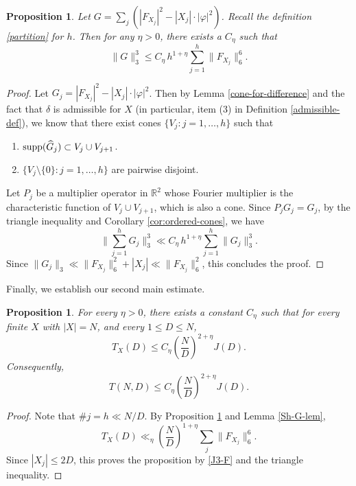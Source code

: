 \documentclass{amsart}
\numberwithin{equation}{section}
\newtheorem{proposition}[theorem]{Proposition}
\newcommand{\vp}{\varphi}
\newcommand{\wh}{\widehat}
\newcommand{\ZR}{\mathbb{R}}
\newcommand{\supp}{{\rm supp}}
\begin{document}
\begin{proposition}
    \label{ortho-prop}
    Let $G=\sum_j(|F_{X_j}|^2-|X_j|\cdot |\vp|^2)$.
    Recall the definition \eqref{partition} for $h$.
    Then for any $\eta>0$, there exists a $C_\eta$ such that
    \begin{equation}
        \|G\|_3^3\leq C_\eta \,h^{1+\eta}\sum_{j=1}^h\|F_{X_j}\|_6^6.
    \end{equation}
\end{proposition}
\begin{proof}
    Let $G_j=|F_{X_j}|^2-|X_j|\cdot |\vp|^2$.
    Then by Lemma \ref{cone-for-difference} and the fact that $\delta$ is admissible for $X$ (in particular, item (3) in Definition \ref{admissible-def}), we know that there exist cones $\{V_j:j=1,\ldots ,h\}$ such that
    \begin{enumerate}
        \item $\supp (\wh G_j)\subset V_j\cup V_{j+1}$.
        \item $\{V_j\setminus\{0\}:j=1,\ldots ,h\}$ are pairwise disjoint.
    \end{enumerate}
    Let $P_j$ be a multiplier operator in $\ZR^2$ whose Fourier multiplier is the characteristic function of $V_j\cup V_{j+1}$, which is also a cone.
    Since $P_j G_j=G_j$, by the triangle inequality and Corollary \ref{cor:ordered-cones}, we have
    \begin{equation}
        \nonumber
        \Big\|\sum_{j=1}^h G_j\Big\|_3^3\ll   C_\eta\, h^{1+\eta}\sum_{j=1}^h\|G_j\|_3^3.
    \end{equation}
    Since $\|G_j\|_3\ll \|F_{X_j}\|_6^2+|X_j|\ll \|F_{X_j}\|_6^2$, this concludes the proof.
    \qedhere
    
\end{proof}


\medskip

Finally, we establish our second main estimate.

\begin{proposition}
    \label{iteration-prop}
    For every $\eta>0$, there exists a constant $C_\eta$ such that for every finite $X$ with $|X|=N$, and every $1\leq D\leq N$,
    \begin{equation}
        \nonumber
        T_X(D)\leq C_\eta\left(\frac{N}{D}\right)^{2+\eta}J(D).
    \end{equation}
    Consequently,
    \begin{equation}
        \label{second-key}
        T(N,D)\leq C_\eta\left(\frac{N}{D}\right)^{2+\eta}J(D).
    \end{equation}
\end{proposition}
\begin{proof}
Note that $\#j=h\ll N/D$.
By Proposition \ref{ortho-prop} and Lemma \ref{Sh-G-lem}, 
\begin{equation}
    \nonumber
    T_X(D)\ll_\eta \left(\frac{N}{D}\right)^{1+\eta}\sum_j\|F_{X_j}\|_6^6.
\end{equation}
Since $|X_j|\leq 2D$, this proves the proposition by \eqref{J3-F} and the triangle inequality.
\qedhere
    
\end{proof}
\end{document}
